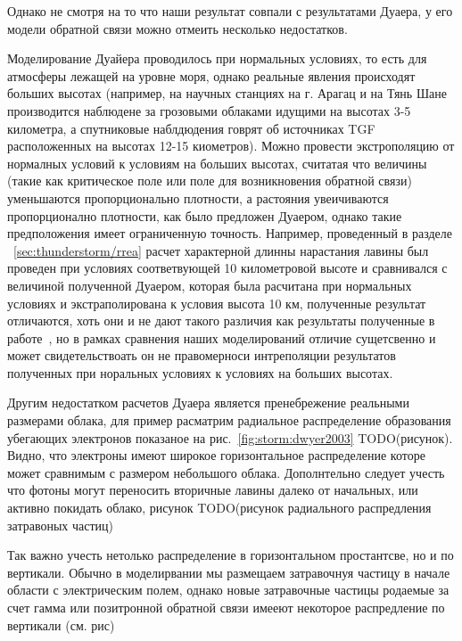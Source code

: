 Однако не смотря на то что наши результат совпали с результатами Дуаера, у его модели обратной связи можно отмеить несколько недостатков. 

Моделирование Дуайера проводилось при нормальных условиях, то есть для атмосферы лежащей на уровне моря, однако реальные явления происходят больших высотах (например, на научных станциях на г. Арагац и на Тянь Шане производится наблюдене за грозовыми облаками идущими на высотах 3-5 километра, а спутниковые наблдюдения говрят об источниках TGF расположенных на высотах 12-15 киометров). Можно провести экстрополяцию от нормалных условий к условиям на больших высотах, считатая что величины (такие как критическое  поле или поле для возникновения обратной связи) уменьшаются пропорционально плотности, а растояния увеичиваются пропорционално плотности, как было предложен Дуаером, однако такие предположения имеет ограниченную точность. Например, проведенный в разделе ~\ref{sec:thunderstorm/rrea} расчет характерной длинны нарастания лавины был проведен при условиях соответвующей 10 километровой высоте и сравнивался с величиной полученной Дуаером, которая была расчитана при нормальных условиях и экстраполирована к условия высота 10 км, полученные результат отличаются, хоть они и не дают такого различия как результаты полученные в работе~\cite{oreshkin2018}, но в рамках сравнения наших моделирований отличие сущетсвенно и может свидетельствоать он не правомерноси интреполяции результатов полученных при норальных условиях к условиях на больших высотах. 

Другим недостатком расчетов Дуаера является пренебрежение реальными размерами облака, для пример расматрим радиальное распределение образования убегающих электронов показаное на рис.~\ref{fig:storm:dwyer2003} TODO(рисунок). Видно, что электроны имеют широкое горизонтальное распределение которе может сравнимым с размером небольшого облака. Дополнтельно следует учесть что фотоны могут переносить вторичные лавины далеко от начальных, или активно покидать облако, рисунок TODO(рисунок радиального распредления затравоных частиц)

Так важно учесть нетолько распределение в горизонтальном простантсве, но и по вертикали. Обычно в моделирвании мы размещаем затравочнуя частицу в начале области с электрическим полем, однако новые затравочные частицы родаемые за счет гамма или позитронной обратной связи имееют некоторое распредление по вертикали (см. рис)





